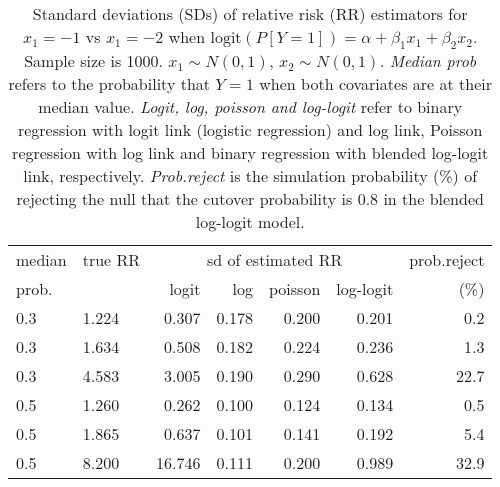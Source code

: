 \documentclass[12pt,a4paper]{article}
\begin{document}
\begin{table}[H] 
\small\sf\centering 
\caption{Standard deviations (SDs) of relative risk (RR) estimators for $x_1=-1$ vs $x_1=-2$ when $\mbox{logit}(P[Y=1])=\alpha+\beta_1 x_1 + \beta_2 x_2$. Sample size is 1000. $x_1 \sim $$N(0,1)$, $x_2 \sim N(0,1)$. {\it Median prob} refers to the probability that $Y=1$ when both covariates are at their median value. {\it Logit, log, poisson and log-logit} refer to binary regression with logit link (logistic regression) and log link, Poisson regression with log link and binary regression with blended log-logit link, respectively. {\it Prob.reject} is the simulation probability (\%) of rejecting the null that the cutover probability is $0.8$ in the blended log-logit model.} 
\begin{tabular}{llrrrrr} 
\toprule 
median & true RR & \multicolumn{4}{c}{sd of estimated RR} & prob.reject \\ 
prob. & & logit & log & poisson & log-logit  & (\%) \\ \midrule 
0.3 & 1.224 &  0.307 & 0.178 & 0.200 & 0.201 &  0.2 \\  
0.3 & 1.634 &  0.508 & 0.182 & 0.224 & 0.236 &  1.3 \\  
0.3 & 4.583 &  3.005 & 0.190 & 0.290 & 0.628 & 22.7 \\  
0.5 & 1.260 &  0.262 & 0.100 & 0.124 & 0.134 &  0.5 \\  
0.5 & 1.865 &  0.637 & 0.101 & 0.141 & 0.192 &  5.4 \\  
0.5 & 8.200 & 16.746 & 0.111 & 0.200 & 0.989 & 32.9 \\  
\bottomrule 
\end{tabular} 
\end{table} 
\end{document}
